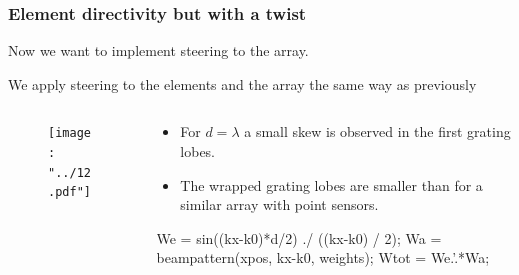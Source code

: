 \documentclass[compress]{beamer}
\begin{document}
\begin{frame}[fragile] %
    \frametitle{Element directivity but with a twist} 
    Now we want to implement steering to the array.

    We apply steering to the elements and the array the same way as previously
    \begin{columns}
        \begin{column}{0.5\textwidth}
            \begin{figure}
                \texttt{[image: "../12.pdf"]}
            \end{figure}
        \end{column}
        \begin{column}{0.52\textwidth}
            \begin{itemize}
                \item For $d=\lambda$ a small skew is observed in the first
                    grating lobes.
                \item The wrapped grating lobes are smaller than for a similar
                    array with point sensors.
            \end{itemize}
            \begin{jllisting}[gobble=16,language=Matlab]
                We = sin((kx-k0)*d/2) ./ ((kx-k0) / 2);
                Wa = beampattern(xpos, kx-k0, weights);
                Wtot = We.'.*Wa;
            \end{jllisting}
        \end{column}
    \end{columns}
\end{frame}
\end{document}
